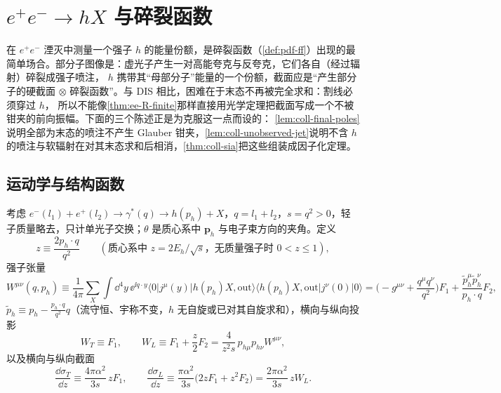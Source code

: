
\section{$e^+e^-\to hX$ 与碎裂函数}\label{sec:coll-sia}

在 $e^+e^-$ 湮灭中测量一个强子 $h$ 的能量份额，是碎裂函数（\cref{def:pdf-ff}）出现的最简单场合。部分子图像是：虚光子产生一对高能夸克与反夸克，它们各自（经过辐射）碎裂成强子喷注，
$h$ 携带其“母部分子”能量的一个份额，截面应是“产生部分子的硬截面 $\otimes$ 碎裂函数”。与 DIS 相比，困难在于末态不再被完全求和：割线必须穿过 $h$，
所以不能像\cref{thm:ee-R-finite}那样直接用光学定理把截面写成一个不被钳夹的前向振幅。下面的三个陈述正是为克服这一点而设的：
\cref{lem:coll-final-poles}说明全部为末态的喷注不产生 Glauber 钳夹，\cref{lem:coll-unobserved-jet}说明不含 $h$ 的喷注与软辐射在对其末态求和后相消，\cref{thm:coll-sia}把这些组装成因子化定理。

\subsection{运动学与结构函数}

\begin{definition}[单举湮灭的运动学]\label{def:coll-sia}
考虑 $e^-(l_1)+e^+(l_2)\to\gamma^*(q)\to h(p_h)+X$，$q=l_1+l_2$，$s=q^2>0$，轻子质量略去，只计单光子交换；$\theta$ 是质心系中 $\bm p_h$ 与电子束方向的夹角。定义
\begin{equation}\label{eq:coll-z}
z\equiv\frac{2p_h\cdot q}{q^2}\qquad(\text{质心系中 }z=2E_h/\sqrt s\text{，无质量强子时 }0<z\le1),
\end{equation}
强子张量
\begin{equation}\label{eq:coll-Wsia}
W^{\mu\nu}(q,p_h)\equiv\frac1{4\pi}\sum_X\int\dd^4y\,\ee^{\ii q\cdot y}\langle0|j^\mu(y)|h(p_h)X,\mathrm{out}\rangle\langle h(p_h)X,\mathrm{out}|j^\nu(0)|0\rangle
=\Big(-g^{\mu\nu}+\frac{q^\mu q^\nu}{q^2}\Big)F_1+\frac{\tilde p_h^\mu\tilde p_h^\nu}{p_h\cdot q}F_2 ,
\end{equation}
$\tilde p_h\equiv p_h-\frac{p_h\cdot q}{q^2}q$（流守恒、宇称不变，$h$ 无自旋或已对其自旋求和），横向与纵向投影
\begin{equation}\label{eq:coll-WTL}
W_T\equiv F_1,\qquad W_L\equiv F_1+\frac z2F_2=\frac{4}{z^2s}\,p_{h\mu}p_{h\nu}W^{\mu\nu},
\end{equation}
以及横向与纵向截面
\begin{equation}\label{eq:coll-sigTL}
\frac{\dd\sigma_T}{\dd z}\equiv\frac{4\pi\alpha^2}{3s}\,zF_1,\qquad \frac{\dd\sigma_L}{\dd z}\equiv\frac{\pi\alpha^2}{3s}\big(2zF_1+z^2F_2\big)=\frac{2\pi\alpha^2}{3s}\,zW_L .
\end{equation}
\end{definition}

